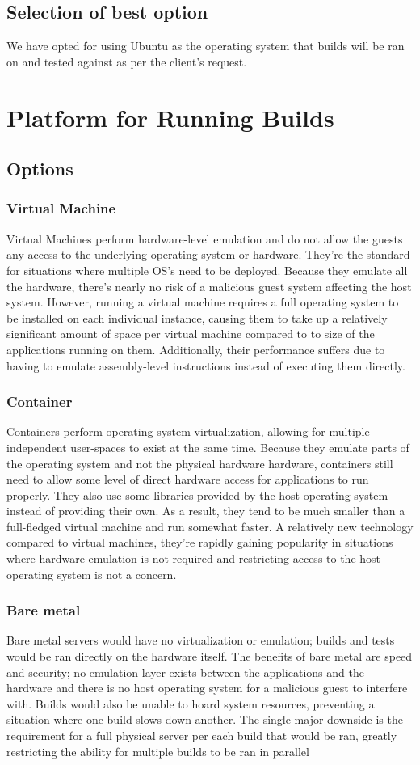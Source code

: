\documentclass[10pt,letterpaper,onecolumn,journal]{IEEEtran}
\begin{document}
\subsection{Selection of best option}
We have opted for using Ubuntu as the operating system that builds will be ran on and tested against as per the client's request.
\section{Platform for Running Builds}
\subsection{Options}
\subsubsection{Virtual Machine}
Virtual Machines perform hardware-level emulation and do not allow the guests any access to the underlying operating system or hardware. They're the standard for situations where multiple OS's need to be deployed. Because they emulate all the hardware, there's nearly no risk of a malicious guest system affecting the host system. However, running a virtual machine requires a full operating system to be installed on each individual instance, causing them to take up a relatively significant amount of space per virtual machine compared to to size of the applications running on them. Additionally, their performance suffers due to having to emulate assembly-level instructions instead of executing them directly.
\subsubsection{Container}
Containers perform operating system virtualization, allowing for multiple independent user-spaces to exist at the same time. Because they emulate parts of the operating system and not the physical hardware hardware, containers still need to allow some level of direct hardware access for applications to run properly. They also use some libraries provided by the host operating system instead of providing their own. As a result, they tend to be much smaller than a full-fledged virtual machine and run somewhat faster. A relatively new technology compared to virtual machines, they're rapidly gaining popularity in situations where hardware emulation is not required and restricting access to the host operating system is not a concern.
\subsubsection{Bare metal}
Bare metal servers would have no virtualization or emulation; builds and tests would be ran directly on the hardware itself. The benefits of bare metal are speed and security; no emulation layer exists between the applications and the hardware and there is no host operating system for a malicious guest to interfere with. Builds would also be unable to hoard system resources, preventing a situation where one build slows down another. The single major downside is the requirement for a full physical server per each build that would be ran, greatly restricting the ability for multiple builds to be ran in parallel
\end{document}

